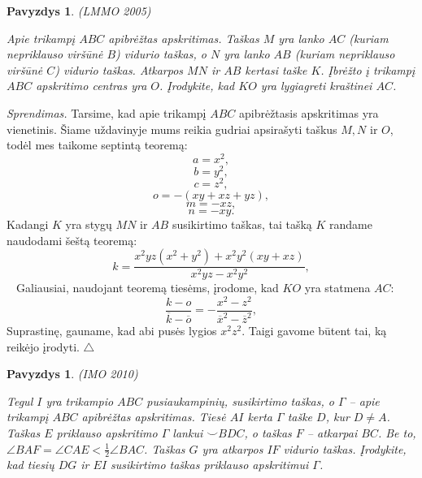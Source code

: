\documentclass[11pt,a4paper,twoside]{book}
\newenvironment{sprendimas}{\noindent \textit{Sprendimas.}}{\hfill $\triangle$}
\newcounter{foo}[subsection]
\newtheorem{pavnr}[foo]{Pavyzdys}
\theoremstyle{definition} \newtheorem*{api}{Apibrėžimas}
\theoremstyle{remark} \newtheorem*{pastaba}{Pastaba}
\begin{document}
\begin{pavnr}
(LMMO 2005)

Apie trikampį $ABC$ apibrėžtas apskritimas. Taškas $M$ yra lanko $AC$ (kuriam nepriklauso viršūnė $B$) vidurio taškas, o $N$ yra lanko $AB$ (kuriam nepriklauso viršūnė $C$) vidurio taškas. Atkarpos $MN$ ir $AB$ kertasi taške $K$. Įbrėžto į trikampį $ABC$ apskritimo centras yra $O$. Įrodykite, kad $KO$ yra lygiagreti kraštinei $AC$. 
\end{pavnr}
\begin{sprendimas}
Tarsime, kad apie trikampį $ABC$ apibrėžtasis apskritimas yra vienetinis. Šiame uždavinyje mums reikia gudriai apsirašyti taškus $M, N$ ir $O$, todėl mes taikome septintą teoremą:
$$a = x^2,$$
$$b=y^2,$$
$$c = z^2,$$
$$ o = - (xy+xz+yz),$$
$$m = - xz,$$
$$ n = - xy.$$
Kadangi $K$ yra stygų $MN$ ir $AB$ susikirtimo taškas, tai tašką $K$ randame naudodami šeštą teoremą:
$$k = \frac{ x^2yz(x^2+y^2)+ x^2 y^2 (xy+xz)}{ x^2 yz - x^2 y^2},$$
$\phantom{a}$ 
Galiausiai, naudojant teoremą tiesėms, įrodome, kad $KO$ yra statmena $AC$:
$$\frac{k-o}{\overline k - \overline o}  = - \frac{ x^2 - z^2}{\overline x^2 - \overline z^2},$$
Suprastinę, gauname, kad abi pusės lygios $x^2 z^2$. Taigi gavome būtent tai, ką reikėjo įrodyti.
\end{sprendimas}







\begin{pavnr}
(IMO 2010)

Tegul $I$ yra trikampio $ABC$ pusiaukampinių, susikirtimo taškas, o $\Gamma$ – apie trikampį $ABC$ apibrėžtas apskritimas. Tiesė $AI$ kerta $\Gamma$ taške $D$, kur $D\ne A$. Taškas $E$ priklauso apskritimo $\Gamma$ lankui $\smile BDC$, o taškas $F$ – atkarpai $BC$. Be to, $\angle BAF = \angle CAE < \frac{1}{2}\angle BAC$. Taškas $G$ yra atkarpos $IF$ vidurio taškas. Įrodykite, kad tiesių $DG$ ir $EI$ susikirtimo taškas priklauso apskritimui $\Gamma$.
\end{pavnr}
\end{document}
